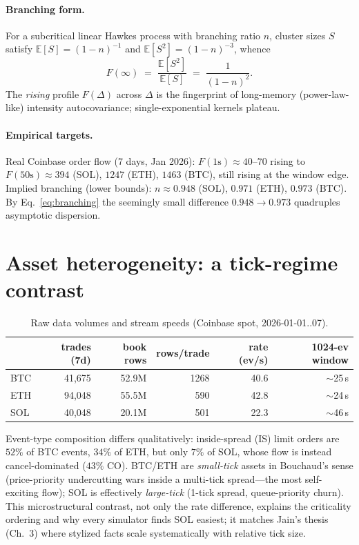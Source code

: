 \documentclass[11pt]{article}
\newcommand{\Fano}{F}
\begin{document}
\paragraph{Branching form.} For a subcritical linear Hawkes process with
branching ratio $n$, cluster sizes $S$ satisfy $\mathbb{E}[S]=(1-n)^{-1}$ and
$\mathbb{E}[S^2]=(1-n)^{-3}$, whence
\begin{equation}
\Fano(\infty)\;=\;\frac{\mathbb{E}[S^2]}{\mathbb{E}[S]}\;=\;\frac{1}{(1-n)^2}.
\label{eq:branching}
\end{equation}
The \emph{rising} profile $\Fano(\Delta)$ across $\Delta$ is the fingerprint of
long-memory (power-law-like) intensity autocovariance; single-exponential
kernels plateau.

\paragraph{Empirical targets.} Real Coinbase order flow (7 days, Jan 2026):
$\Fano(1\mathrm{s})\!\approx\!40$--$70$ rising to $\Fano(50\mathrm{s})\approx
394$ (SOL), $1247$ (ETH), $1463$ (BTC), still rising at the window edge.
Implied branching (lower bounds): $n\approx0.948$ (SOL), $0.971$ (ETH),
$0.973$ (BTC). By Eq.~\eqref{eq:branching} the seemingly small difference
$0.948\!\to\!0.973$ quadruples asymptotic dispersion.

\section{Asset heterogeneity: a tick-regime contrast}
\label{sec:assets}
\begin{table}[h]\centering\small
\begin{tabular}{lrrrrr}
\toprule
 & trades (7d) & book rows & rows/trade & rate (ev/s) & 1024-ev window \\
\midrule
BTC & 41{,}675 & 52.9M & 1268 & 40.6 & $\sim$25\,s \\
ETH & 94{,}048 & 55.5M & 590 & 42.8 & $\sim$24\,s \\
SOL & 40{,}048 & 20.1M & 501 & 22.3 & $\sim$46\,s \\
\bottomrule
\end{tabular}
\caption{Raw data volumes and stream speeds (Coinbase spot, 2026-01-01..07).}
\end{table}

Event-type composition differs qualitatively: inside-spread (IS) limit orders
are $52\%$ of BTC events, $34\%$ of ETH, but only $7\%$ of SOL, whose flow is
instead cancel-dominated ($43\%$ CO). BTC/ETH are \emph{small-tick} assets in
Bouchaud's sense (price-priority undercutting wars inside a multi-tick
spread---the most self-exciting flow); SOL is effectively \emph{large-tick}
(1-tick spread, queue-priority churn). This microstructural contrast, not
only the rate difference, explains the criticality ordering and why every
simulator finds SOL easiest; it matches Jain's thesis (Ch.~3) where stylized
facts scale systematically with relative tick size.
\end{document}
